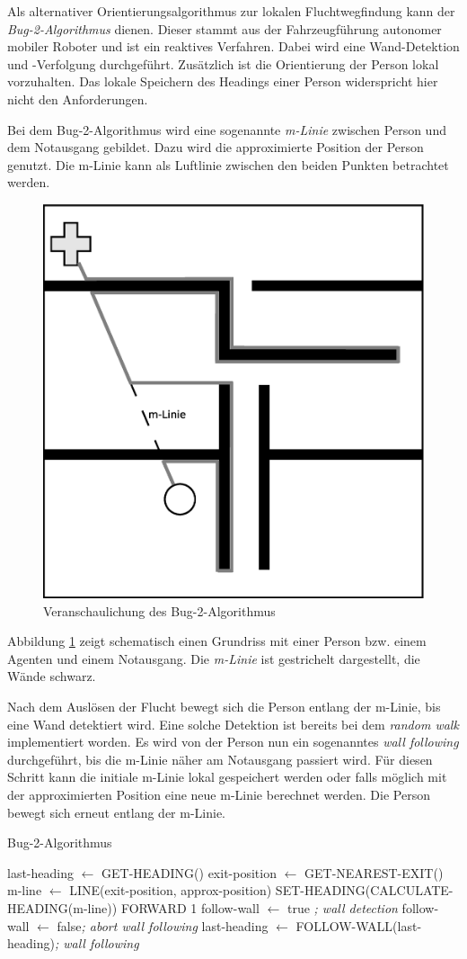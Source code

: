 Als alternativer Orientierungsalgorithmus zur lokalen Fluchtwegfindung kann der \emph{Bug-2-Algorithmus} dienen. Dieser stammt aus der Fahrzeugführung autonomer mobiler Roboter und ist ein reaktives Verfahren.
Dabei wird eine Wand-Detektion und -Verfolgung durchgeführt. Zusätzlich ist die Orientierung der Person lokal vorzuhalten. Das lokale Speichern des Headings einer Person widerspricht hier nicht den Anforderungen.

Bei dem Bug-2-Algorithmus wird eine sogenannte \emph{m-Linie} zwischen Person und dem Notausgang gebildet. Dazu wird die approximierte Position der Person genutzt. Die m-Linie kann als Luftlinie zwischen den beiden Punkten betrachtet werden.

\begin{figure}[!ht]
\centering
\includegraphics[height=0.35\textwidth]{evaluation/bug_2}
\caption{Veranschaulichung des Bug-2-Algorithmus}
\label{fig:bug_2}
\end{figure}

Abbildung \ref{fig:bug_2} zeigt schematisch einen Grundriss mit einer Person bzw. einem Agenten und einem Notausgang. Die \emph{m-Linie} ist gestrichelt dargestellt, die Wände schwarz.

Nach dem Auslösen der Flucht bewegt sich die Person entlang der m-Linie, bis eine Wand detektiert wird. Eine solche Detektion ist bereits bei dem \emph{random walk} implementiert worden. Es wird von der Person nun ein sogenanntes \emph{wall following} durchgeführt, bis die m-Linie näher am Notausgang passiert wird. Für diesen Schritt kann die initiale m-Linie lokal gespeichert werden oder falls möglich mit der approximierten Position eine neue m-Linie berechnet werden. Die Person bewegt sich erneut entlang der m-Linie.



\begin{algorithm}
\caption{Bug-2-Algorithmus}
\label{alg:bug_2}
\begin{algorithmic} 
\STATE last-heading $\leftarrow$ GET-HEADING()
\STATE exit-position $\leftarrow$ GET-NEAREST-EXIT()
\STATE m-line $\leftarrow$ LINE(exit-position, approx-position)
\STATE SET-HEADING(CALCULATE-HEADING(m-line))
\STATE FORWARD 1
\ELSE
\STATE follow-wall $\leftarrow$ true \hfill\emph{; wall detection}
\ENDIF
{}
\STATE follow-wall $\leftarrow$ false\hfill\emph{; abort wall following}
\ELSE
\STATE last-heading $\leftarrow$ FOLLOW-WALL(last-heading)\hfill\emph{; wall following}
\ENDIF
\ENDWHILE
\ENDWHILE
\end{algorithmic}
\end{algorithm}



